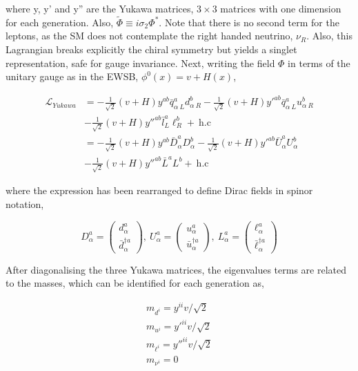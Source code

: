 where y, y' and y'' are the Yukawa matrices, $3\times3$ matrices with one dimension for each generation. Also, $\tilde{\Phi}\equiv i\sigma_2\Phi^*$. Note that there is no second term for the leptons, as the SM does not contemplate the right handed neutrino, $\nu_R$. Also, this Lagrangian breaks explicitly the chiral symmetry but yields a singlet representation, safe for gauge invariance. Next, writing the field $\Phi$ in terms of the unitary gauge as in the EWSB, $\phi^0(x)=v+H(x)$,

\begin{equation}
\begin{split}
    \mathcal{L}_{Yukawa} &= -\frac{1}{\sqrt{2}}(v+H)y^{ab}\bar{q}^a_{\alpha\ L} d^b_{\alpha\ R} - \frac{1}{\sqrt{2}}(v+H)y'^{ab}\bar{q}^a_{\alpha\ L}u^b_{\alpha\ R}\\
    &-\frac{1}{\sqrt{2}}(v+H)y''^{ab}\bar{l}^a_{L}\ell^b_{R}+\ \text{h.c}\\
    &=-\frac{1}{\sqrt{2}}(v+H)y^{ab} \bar{D}^a_\alpha D^b_\alpha - \frac{1}{\sqrt{2}}(v+H)y'^{ab}\bar{U}^a_\alpha U^b_\alpha\\
    &-\frac{1}{\sqrt{2}}(v+H)y''^{ab}\bar{L}^a L^b+\ \text{h.c}
\end{split}
\end{equation}

where the expression has been rearranged to define Dirac fields in spinor notation,

\begin{equation}
\label{Theory_eq:Diracmassspace}
    D_\alpha^a = \begin{pmatrix} d_\alpha^a \\ \bar{d}^{\dag a}_\alpha \end{pmatrix},\ 
    U_\alpha^a = \begin{pmatrix} u_\alpha^a \\ \bar{u}^{\dag a}_\alpha \end{pmatrix},\ 
    L_\alpha^a = \begin{pmatrix} \ell_\alpha^a \\ \bar{\ell}^{\dag a}_\alpha \end{pmatrix}
\end{equation}

After diagonalising the three Yukawa matrices, the eigenvalues terms are related to the masses, which can be identified for each generation as,

\begin{equation}
\begin{split}
m_{d^i} = y^{ii}v/\sqrt{2} \\ 
m_{u^i} = y'^{ii}v/\sqrt{2} \\
m_{\ell^i} = y''^{ii}v/\sqrt{2} \\
m_{\nu^i} = 0
\end{split}
\label{Theory_eq:yukawacouplings}
\end{equation}

